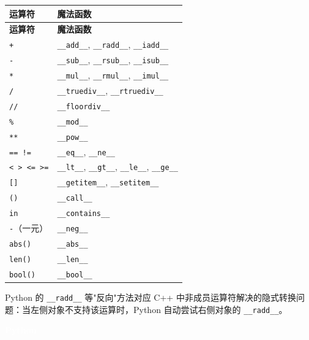 \documentclass[12pt,a4paper,fontset=fandol]{ctexbook}
\newcommand{\cpp}[1]{C++#1}
\newcommand{\pythonlabel}{%
  \noindent\begin{tcolorbox}[sharp corners,colback=pythonheadbg,colframe=pythonheadbg,
    left=6pt,right=6pt,top=2pt,bottom=2pt,boxrule=0pt]
  \textcolor{white}{\small\bfseries\sffamily Python}\end{tcolorbox}%
}
\begin{document}
\begin{longtable}{ll}
\toprule
\textbf{运算符} & \textbf{魔法函数} \\
\midrule
\endfirsthead
\toprule
\textbf{运算符} & \textbf{魔法函数} \\
\midrule
\endhead
\bottomrule
\endfoot

\texttt{+} & \texttt{\_\_add\_\_}, \texttt{\_\_radd\_\_}, \texttt{\_\_iadd\_\_} \\
\texttt{-} & \texttt{\_\_sub\_\_}, \texttt{\_\_rsub\_\_}, \texttt{\_\_isub\_\_} \\
\texttt{*} & \texttt{\_\_mul\_\_}, \texttt{\_\_rmul\_\_}, \texttt{\_\_imul\_\_} \\
\texttt{/} & \texttt{\_\_truediv\_\_}, \texttt{\_\_rtruediv\_\_} \\
\texttt{//} & \texttt{\_\_floordiv\_\_} \\
\texttt{\%} & \texttt{\_\_mod\_\_} \\
\texttt{**} & \texttt{\_\_pow\_\_} \\
\texttt{== !=} & \texttt{\_\_eq\_\_}, \texttt{\_\_ne\_\_} \\
\texttt{< > <= >=} & \texttt{\_\_lt\_\_}, \texttt{\_\_gt\_\_}, \texttt{\_\_le\_\_}, \texttt{\_\_ge\_\_} \\
\texttt{[]} & \texttt{\_\_getitem\_\_}, \texttt{\_\_setitem\_\_} \\
\texttt{()} & \texttt{\_\_call\_\_} \\
\texttt{in} & \texttt{\_\_contains\_\_} \\
\texttt{-}（一元） & \texttt{\_\_neg\_\_} \\
\texttt{abs()} & \texttt{\_\_abs\_\_} \\
\texttt{len()} & \texttt{\_\_len\_\_} \\
\texttt{bool()} & \texttt{\_\_bool\_\_} \\
\end{longtable}

Python 的 \texttt{\_\_radd\_\_} 等"反向"方法对应 \cpp{} 中非成员运算符解决的隐式转换问题：当左侧对象不支持该运算时，Python 自动尝试右侧对象的 \texttt{\_\_radd\_\_}。

\pythonlabel
\end{document}
